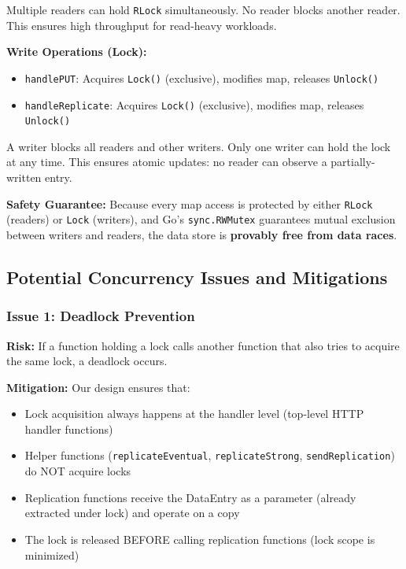 \documentclass[10pt,a4paper]{article}
\begin{document}
Multiple readers can hold \texttt{RLock} simultaneously. No reader blocks another reader. This ensures high throughput for read-heavy workloads.

\textbf{Write Operations (Lock):}
\begin{itemize}
    \item \texttt{handlePUT}: Acquires \texttt{Lock()} (exclusive), modifies map, releases \texttt{Unlock()}
    \item \texttt{handleReplicate}: Acquires \texttt{Lock()} (exclusive), modifies map, releases \texttt{Unlock()}
\end{itemize}

A writer blocks all readers and other writers. Only one writer can hold the lock at any time. This ensures atomic updates: no reader can observe a partially-written entry.

\textbf{Safety Guarantee:} Because every map access is protected by either \texttt{RLock} (readers) or \texttt{Lock} (writers), and Go's \texttt{sync.RWMutex} guarantees mutual exclusion between writers and readers, the data store is \textbf{provably free from data races}.

\subsection{Potential Concurrency Issues and Mitigations}

\subsubsection{Issue 1: Deadlock Prevention}

\textbf{Risk:} If a function holding a lock calls another function that also tries to acquire the same lock, a deadlock occurs.

\textbf{Mitigation:} Our design ensures that:
\begin{itemize}
    \item Lock acquisition always happens at the handler level (top-level HTTP handler functions)
    \item Helper functions (\texttt{replicateEventual}, \texttt{replicateStrong}, \texttt{sendReplication}) do NOT acquire locks
    \item Replication functions receive the DataEntry as a parameter (already extracted under lock) and operate on a copy
    \item The lock is released BEFORE calling replication functions (lock scope is minimized)
\end{itemize}
\end{document}
